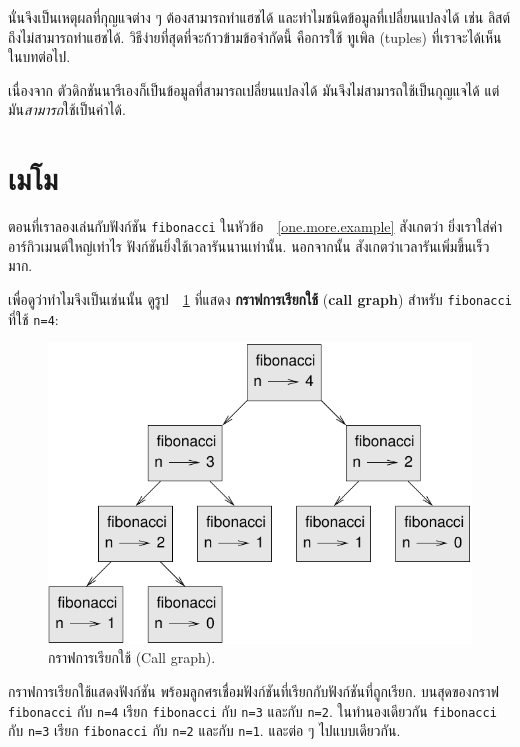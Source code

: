 นั่นจึงเป็นเหตุผลที่กุญแจต่าง ๆ ต้องสามารถทำแฮชได้ และทำไมชนิดข้อมูลที่เปลี่ยนแปลงได้  เช่น ลิสต์ถึงไม่สามารถทำแฮชได้.
วิธีง่ายที่สุดที่จะก้าวข้ามข้อจำกัดนี้ คือการใช้ ทูเพิล (tuples) ที่เราจะได้เห็นในบทต่อไป.

เนื่องจาก ตัวดิกชันนารีเองก็เป็นข้อมูลที่สามารถเปลี่ยนแปลงได้
มันจึงไม่สามารถใช้เป็นกุญแจได้
แต่มัน\emph{สามารถ}ใช้เป็นค่าได้.

\section{เมโม}
\label{memoize}

ตอนที่เราลองเล่นกับฟังก์ชัน \texttt{fibonacci} ในหัวข้อ~~\ref{one.more.example}
สังเกตว่า ยิ่งเราใส่ค่าอาร์กิวเมนต์ใหญ่เท่าไร 
ฟังก์ชันยิ่งใช้เวลารันนานเท่านั้น.
%
นอกจากนั้น สังเกตว่าเวลารันเพิ่มขึ้นเร็วมาก.

เพื่อดูว่าทำไมจึงเป็นเช่นนั้น
ดูรูป~~\ref{fig.fibonacci} ที่แสดง \textbf{กราฟการเรียกใช้} (\textbf{call graph}) สำหรับ \texttt{fibonacci} ที่ใช้ \texttt{n=4}:

\begin{figure}
\centerline
{\includegraphics[scale=0.7]{figs/fibonacci.pdf}}
\caption{กราฟการเรียกใช้ (Call graph).}
\label{fig.fibonacci}
\end{figure}

กราฟการเรียกใช้แสดงฟังก์ชัน พร้อมลูกศรเชื่อมฟังก์ชันที่เรียกกับฟังก์ชันที่ถูกเรียก.
บนสุดของกราฟ \texttt{fibonacci} กับ \texttt{n=4} เรียก
\texttt{fibonacci} กับ \texttt{n=3} และกับ \texttt{n=2}.  
ในทำนองเดียวกัน \texttt{fibonacci} กับ \texttt{n=3} เรียก
\texttt{fibonacci} กับ \texttt{n=2} และกับ \texttt{n=1}.  
และต่อ ๆ ไปแบบเดียวกัน.

